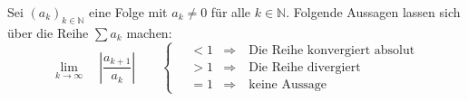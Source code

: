 Sei $(a_k)_{k \in \mathbb{N}}$ eine Folge mit $a_k \neq 0$ für alle $k \in \mathbb{N}$. Folgende Aussagen lassen sich über die Reihe $\sum a_k$ machen:
$$
\lim_{k \to \infty} \quad \left| \frac{a_{k+1}}{a_k} \right| \qquad
\begin{cases}
    \quad < 1 & \Rightarrow \quad \text{Die Reihe konvergiert absolut} \\
    \quad > 1 & \Rightarrow \quad \text{Die Reihe divergiert} \\
    \quad = 1 & \Rightarrow \quad \text{keine Aussage}
\end{cases}
$$